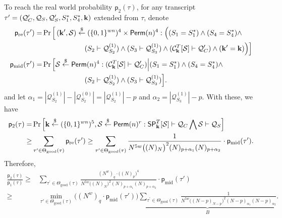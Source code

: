 To reach the real world probability $\mathsf{p}_2(\tau)$, for any transcript $\tau'=(\mathcal{Q}_{C}',\mathcal{Q}_{S},\mathcal{Q}_{S}',S_1^*,S_4^*,\mathbf{k})$ extended from $\tau$, denote            {\small
%
%
\begin{align}
\mathsf{p}_{\mathrm{re}}(\tau') = & \operatorname{Pr}\Big[\left(\mathbf{k}',\mathcal{S}\right) \stackrel{\$}{\leftarrow} (\{0,1\}^{wn})^4 \times \mathsf{Perm}(n)^4:
\Big((S_1=S_1^*)\wedge (S_4=S_4^*)\wedge		\notag 	\\
&\codeindent\codeindent\codeindent\codeindent\codeindent\codeindent\codeindent\codeindent\codeindent (S_2\vdash\mathcal{Q}_{S_2}^{(1)})\wedge (S_3\vdash\mathcal{Q}_{S_3}^{(1)})\wedge (\calC_{\bfk}^T[\calS] \vdash \mathcal{Q}_C')\wedge(\bfk'=\bfk)\Big)\Big]\\
\mathsf{p}_{\mathrm{mid}}(\tau') = & \operatorname{Pr}\Big[\mathcal{S} \stackrel{\$}{\leftarrow}\mathsf{Perm}(n)^4:(\calC_{\bfk}^T[\calS] \vdash \mathcal{Q}_C')\Big|
%
(S_1=S_1^*)\wedge (S_4=S_4^*)\wedge	 	\notag 	\\
&\codeindent\codeindent\codeindent\codeindent\codeindent\codeindent\codeindent\codeindent\codeindent (S_2\vdash\mathcal{Q}_{S_2}^{(1)})\wedge (S_3\vdash\mathcal{Q}_{S_3}^{(1)})\Big].
\label{eq:defn-p-mid}
\end{align}
}%
%
%
and let $\alpha_1=|\mathcal{Q}_{S_2}^{(1)}|-|\mathcal{Q}_{S_2}^{(0)}|=|\mathcal{Q}_{S_2}^{(1)}|-p$ and $\alpha_2=|\mathcal{Q}_{S_3}^{(1)}|-p$. With these, we have
%
%
\begin{align*}
\mathsf{p}_2(\tau)=&\operatorname{Pr}\left[\bfk \stackrel{\$}{\leftarrow} (\{0,1\}^{wn})^5, \mathcal{S} \stackrel{\$}{\leftarrow} \mathsf{Perm}(n)^{r}:\spn_{\bfk}^{T}[\mathcal{S}] \vdash \mathcal{Q}_{C} \bigwedge \mathcal{S} \vdash \mathcal{Q}_{S}\right]		\\
\geq & \sum_{\tau^{\prime} \in \Theta_{\mathrm{good}}(\tau)} \mathsf{p}_{\mathrm{re}}(\tau')  
\geq
\sum_{\tau^{\prime} \in \Theta_{\mathrm{good}}(\tau)}
%
\frac{1}{N^{5w}\big((N)_{N}\big)^2(N)_{p+\alpha_1}(N)_{p+\alpha_2}}\cdot \mathsf{p}_{\mathrm{mid}}(\tau')  .
\end{align*}
%
%
Therefore,
%
%
\begin{align*}
\frac{\mathsf{p}_{2}(\tau)}{\mathsf{p}_{1}(\tau)}   \geq  &
\sum_{\tau^{\prime} \in \Theta_{\mathrm{good}}(\tau)}
\frac{(N^w)_q\cdot\big((N)_p\big)^4}{N^{5w}\big((N)_{N}\big)^2(N)_{p+\alpha_1}(N)_{p+\alpha_2}}\cdot \mathsf{p}_{\mathrm{mid}}(\tau')         \\
\geq  &    \min_{\tau' \in \Theta_{\mathrm{good}}(\tau)}\big((N^w)_q\cdot\mathsf{p}_{\mathrm{mid}}(\tau')\big)
\underbrace{\sum_{\tau^{\prime} \in \Theta_{\mathrm{good}}(\tau)}
\frac{1}{N^{5w}\big((N-p)_{N-p}\big)^2(N-p)_{\alpha_1}(N-p)_{\alpha_2}}}_{B} .
\end{align*}


